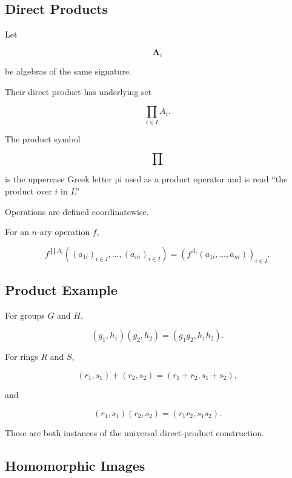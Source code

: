 \subsection{Direct Products}
\label{subsec:universal-direct-products}

Let

\[ \mathbf A_i \]

be algebras of the same signature.

Their direct product has underlying set

\[ \prod_{i\in I}A_i. \]

The product symbol

\[ \prod \]

is the uppercase Greek letter pi used as a product operator and is read
``the product over \(i\) in \(I\).''

Operations are defined coordinatewise.

For an \(n\)-ary operation \(f\),

\[
f^{\prod A_i}
\left(
(a_{1i})_{i\in I},\ldots,(a_{ni})_{i\in I}
\right)
=
\left(
f^{A_i}(a_{1i},\ldots,a_{ni})
\right)_{i\in I}.
\]

\subsection{Product Example}
\label{subsec:universal-product-example}

For groups \(G\) and \(H\),

\[ (g_1,h_1)(g_2,h_2)
=(g_1g_2,h_1h_2). \]

For rings \(R\) and \(S\),

\[ (r_1,s_1)+(r_2,s_2)
=(r_1+r_2,s_1+s_2), \]

and

\[ (r_1,s_1)(r_2,s_2)
=(r_1r_2,s_1s_2). \]

These are both instances of the universal direct-product construction.

\subsection{Homomorphic Images}
\label{subsec:homomorphic-images}

